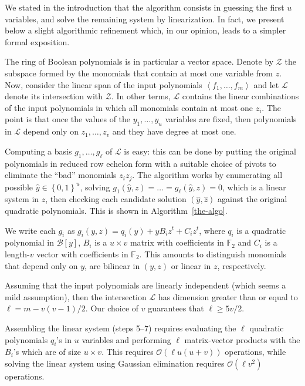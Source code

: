 \documentclass[a4paper,UKenglish,cleveref, autoref]{lipics-v2019}
\newcommand{\bits}{\left\{0, 1\right\}}
\newcommand{\bigO}[1]{\ensuremath{\mathcal{O}\left( #1 \right)} }
\begin{document}
We stated in the introduction that the algorithm consists in guessing the first
$u$ variables, and solve the remaining system by linearization. In fact, we
present below a slight algorithmic refinement which, in our opinion, leads to a
simpler formal exposition.

The ring of Boolean polynomials is in particular a vector space. Denote by
$\mathcal{Z}$ the subspace formed by the monomials that contain at most one
variable from $z$. Now, consider the linear span of the input polynomials
$\left\langle f_1, \dots, f_m\right\rangle$ and let $\mathcal{L}$ denote its
intersection with $\mathcal{Z}$. In other terms, $\mathcal{L}$ contains the
linear combinations of the input polynomials in which all monomials contain at
most one $z_i$. The point is that once the values of the $y_1, \dots, y_u$
variables are fixed, then polynomials in $\mathcal{L}$ depend only on
$z_1, \dots, z_v$ and they have degree at most one.

Computing a basis $g_1, \dots, g_\ell$ of $\mathcal{L}$ is easy: this can be
done by putting the original polynomials in reduced row echelon form with a
suitable choice of pivots to eliminate the ``bad'' monomials $z_i z_j$. The
algorithm works by enumerating all possible $\hat y \in \bits^u$, solving
$g_1(\hat y, z) = \dots = g_\ell(\hat y, z) = 0$, which is a linear system in
$z$, then checking each candidate solution $(\hat y, \hat z)$ against the
original quadratic polynomials. This is shown in Algorithm~\ref{the-algo}.

We write each $g_i$ as $g_i(y, z) = q_i(y) + y B_i z^t + C_i z^t$, where $q_i$
is a quadratic polynomial in $\mathcal{B}[y]$, $B_i$ is a $u \times v$ matrix
with coefficients in $\mathbb{F}_2$ and $C_i$ is a length-$v$ vector with
coefficients in $\mathbb{F}_2$. This amounts to distinguish monomials that
depend only on $y$, are bilinear in $(y, z)$ or linear in $z$, respectively.

Assuming that the input polynomials are linearly independent (which seems a mild
assumption), then the intersection $\mathcal{L}$ has dimension greater than or
equal to $\ell = m - v(v-1)/2$. Our choice of $v$ guarantees that
$\ell \geq 5v/2$.

Assembling the linear system (steps 5--7) requires evaluating the $\ell$
quadratic polynomials $q_i$'s in $u$ variables and performing $\ell$
matrix-vector products with the $B_i$'s which are of size $u \times v$.  This
requires $\bigO{\ell u(u+v)}$ operations, while solving the linear system using
Gaussian elimination requires $\bigO{\ell v^2}$ operations.
\end{document}
